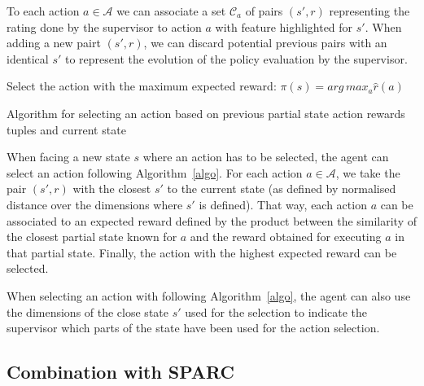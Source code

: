 \documentclass[letterpaper]{article} %
\begin{document}
To each action
$a \in \mathcal{A}$ we can associate a set $\mathcal{C}_{a}$ of pairs $(s',r)$
representing the rating done by the supervisor to action $a$ with feature
highlighted for $s'$. When adding a new pairt $(s',r)$, we can discard potential
previous pairs with an identical $s'$ to represent the evolution of the policy
evaluation by the supervisor.

\begin{algorithm}
    \DontPrintSemicolon
    Select the action with the maximum expected reward:
    $\pi(s) = arg\, max_{a} \hat{r}(a)$

    \caption{Algorithm for selecting an action based on previous
    partial state action rewards tuples and current state}
    \label{algo}
\end{algorithm}


When facing a new state $s$ where an action has to be
selected, the agent can select an action following Algorithm~\ref{algo}. For
each action $a \in \mathcal{A}$, we take the pair $(s',r)$ with the closest $s'$
to the current state (as defined by normalised distance over the dimensions
where $s'$ is defined). That way, each action $a$ can be associated to an
expected reward defined by the product between the similarity of the closest
partial state known for $a$ and the reward obtained for executing $a$ in that partial state.
Finally, the action with the highest expected reward can be selected.

When selecting an action with following Algorithm~\ref{algo}, the agent can also use
the dimensions of the close state $s'$ used for the selection to indicate the
supervisor which parts of the state have been used for the action selection.

\subsection{Combination with SPARC}
\end{document}
